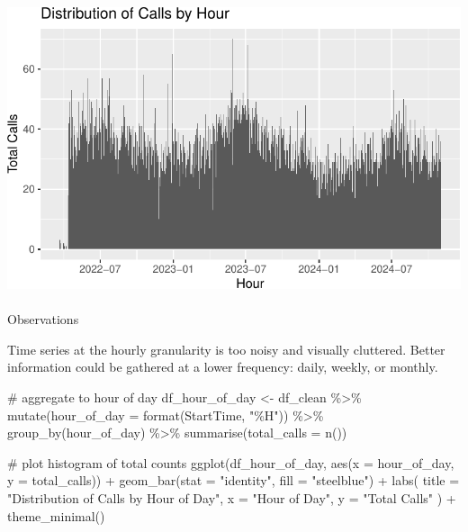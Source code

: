 \documentclass[
  letterpaper,
  DIV=11,
  numbers=noendperiod]{scrartcl}
\makeatletter
\let\oldparagraph\paragraph
\renewcommand{\paragraph}{
    \@ifstar
      \xxxParagraphStar
      \xxxParagraphNoStar
  }
\newcommand{\xxxParagraphStar}[1]{\oldparagraph*{#1}\mbox{}}
\newcommand{\xxxParagraphNoStar}[1]{\oldparagraph{#1}\mbox{}}
\newenvironment{Shaded}{\begin{snugshade}}{\end{snugshade}}
\newcommand{\AttributeTok}[1]{\textcolor[rgb]{0.40,0.45,0.13}{#1}}
\newcommand{\CommentTok}[1]{\textcolor[rgb]{0.37,0.37,0.37}{#1}}
\newcommand{\FunctionTok}[1]{\textcolor[rgb]{0.28,0.35,0.67}{#1}}
\newcommand{\NormalTok}[1]{\textcolor[rgb]{0.00,0.23,0.31}{#1}}
\newcommand{\OtherTok}[1]{\textcolor[rgb]{0.00,0.23,0.31}{#1}}
\newcommand{\SpecialCharTok}[1]{\textcolor[rgb]{0.37,0.37,0.37}{#1}}
\newcommand{\StringTok}[1]{\textcolor[rgb]{0.13,0.47,0.30}{#1}}
\makeatother
\begin{document}
\includegraphics{final_proj_group1_files/figure-pdf/hourly-2.pdf}

\paragraph{Observations}\label{observations-2}

Time series at the hourly granularity is too noisy and visually
cluttered. Better information could be gathered at a lower frequency:
daily, weekly, or monthly.

\begin{Shaded}
\begin{Highlighting}[]
\CommentTok{\# aggregate to hour of day}
\NormalTok{df\_hour\_of\_day }\OtherTok{\textless{}{-}}\NormalTok{ df\_clean }\SpecialCharTok{\%\textgreater{}\%}
  \FunctionTok{mutate}\NormalTok{(}\AttributeTok{hour\_of\_day =} \FunctionTok{format}\NormalTok{(StartTime, }\StringTok{"\%H"}\NormalTok{)) }\SpecialCharTok{\%\textgreater{}\%}
  \FunctionTok{group\_by}\NormalTok{(hour\_of\_day) }\SpecialCharTok{\%\textgreater{}\%}
  \FunctionTok{summarise}\NormalTok{(}\AttributeTok{total\_calls =} \FunctionTok{n}\NormalTok{())}

\CommentTok{\# plot histogram of total counts}
\FunctionTok{ggplot}\NormalTok{(df\_hour\_of\_day, }\FunctionTok{aes}\NormalTok{(}\AttributeTok{x =}\NormalTok{ hour\_of\_day, }\AttributeTok{y =}\NormalTok{ total\_calls)) }\SpecialCharTok{+}
  \FunctionTok{geom\_bar}\NormalTok{(}\AttributeTok{stat =} \StringTok{"identity"}\NormalTok{, }\AttributeTok{fill =} \StringTok{"steelblue"}\NormalTok{) }\SpecialCharTok{+} 
  \FunctionTok{labs}\NormalTok{(}
    \AttributeTok{title =} \StringTok{"Distribution of Calls by Hour of Day"}\NormalTok{, }
    \AttributeTok{x =} \StringTok{"Hour of Day"}\NormalTok{, }
    \AttributeTok{y =} \StringTok{"Total Calls"}
\NormalTok{  ) }\SpecialCharTok{+}
  \FunctionTok{theme\_minimal}\NormalTok{()}
\end{Highlighting}
\end{Shaded}
\end{document}
